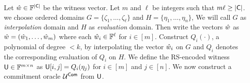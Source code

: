 Let $\hat{w} \in \mathbb{F}^{|\mathsf{C}|}$ be the witness vector. Let $m$ and $\ell$ be integers such that $m\ell\geq \mathsf{|C|}$. we choose ordered domains $G=\{\zeta_1,\ldots,\zeta_\ell\}$ and $H=\{\eta_1,\ldots,\eta_n\}$, We will call $G$ as {\em interpolation} domain and $H$ as {\em evaluation} domain. Then write the vectors $\hat{w}$ as $\hat{w} = (\hat{w}_{1},\ldots,\hat{w}_{m})$ where each $\hat{w}_{i}\in \mathbb{F}^\ell$ for $i \in [m]$. Construct $Q_i(\cdot)$, a polynomial of degree $<k$, by interpolating the vector $\hat{w}_{i}$ on $G$ and $Q_{i}$ denotes the corresponding evaluation of $Q_{i}$ on $H$. We define the RS-encoded witness $\mathsf{U}\in \mathbb{F}^{m\times n}$ as $\mathsf{U}[i,j]=Q_{i}(\eta_j)$ for $ i\in [m]$ and $j\in [n]$. We now construct a commitment oracle $\mathcal{U}^{\mathsf{Com}}$ from $\mathsf{U}$.
